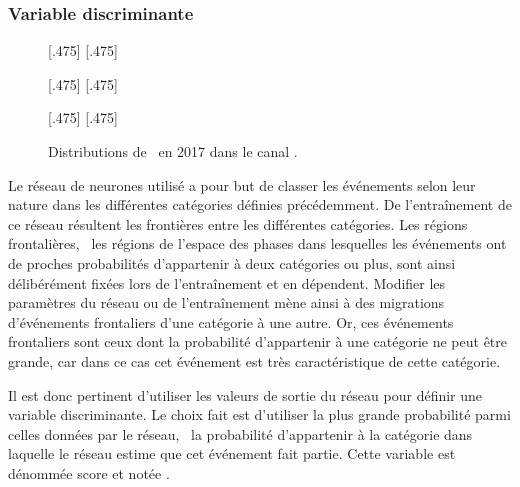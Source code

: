 \subsubsection{Variable discriminante}
\begin{figure}[p]
\centering

[.475\textwidth]
{}
\hfill
{}[.475\textwidth]
{}

[.475\textwidth]
{}
\hfill
{}[.475\textwidth]
{}

[.475\textwidth]
{}
\hfill
{}[.475\textwidth]
{}

\caption[Distributions de \NNscore\ en 2017 dans le canal \ele\mu.]{Distributions de \NNscore\ en 2017 dans le canal \ele\mu.}
\label{fig-NNscore_distribs_exemple}
\end{figure}
Le réseau de neurones utilisé a pour but de classer les événements selon leur nature dans les différentes catégories définies précédemment.
De l'entraînement de ce réseau résultent les frontières entre les différentes catégories.
Les régions frontalières, \ie\ les régions de l'espace des phases dans lesquelles les événements ont de proches probabilités d'appartenir à deux catégories ou plus, sont ainsi délibérément fixées lors de l'entraînement et en dépendent.
Modifier les paramètres du réseau ou de l'entraînement mène ainsi à des migrations d'événements frontaliers d'une catégorie à une autre.
Or, ces événements frontaliers sont ceux dont la probabilité d'appartenir à une catégorie ne peut être grande, car dans ce cas cet événement est très caractéristique de cette catégorie.
\par
Il est donc pertinent d'utiliser les valeurs de sortie du réseau pour définir une variable discriminante.
Le choix fait est d'utiliser la plus grande probabilité parmi celles données par le réseau, \ie\ la probabilité d'appartenir à la catégorie dans laquelle le réseau estime que cet événement fait partie.
Cette variable est dénommée \og score \fg{} et notée \NNscore.
